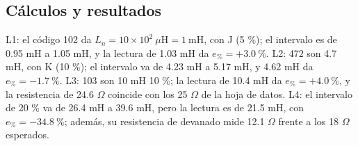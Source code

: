 \documentclass[11pt,letterpaper]{article}
\begin{document}
\subsection{Cálculos y resultados}

L1: el código 102 da $L_n = 10 \times 10^2\ \mu\text{H} = 1\ \text{mH}$, con J (\textpm{}5 \%); el intervalo es de 0.95 mH a 1.05 mH, y la lectura de 1.03 mH da $e_{\text{\%}} = +3.0\ \text{\%}$. L2: 472 son 4.7 mH, con K (\textpm{}10 \%); el intervalo va de 4.23 mH a 5.17 mH, y 4.62 mH da $e_{\text{\%}} = -1.7\ \text{\%}$. L3: 103 son 10 mH \textpm{}10 \%; la lectura de 10.4 mH da $e_{\text{\%}} = +4.0\ \text{\%}$, y la resistencia de 24.6 \ensuremath{\Omega} coincide con los 25 \ensuremath{\Omega} de la hoja de datos. L4: el intervalo de \textpm{}20 \% va de 26.4 mH a 39.6 mH, pero la lectura es de 21.5 mH, con $e_{\text{\%}} = -34.8\ \text{\%}$; además, su resistencia de devanado mide 12.1 \ensuremath{\Omega} frente a los 18 \ensuremath{\Omega} esperados.
\end{document}
